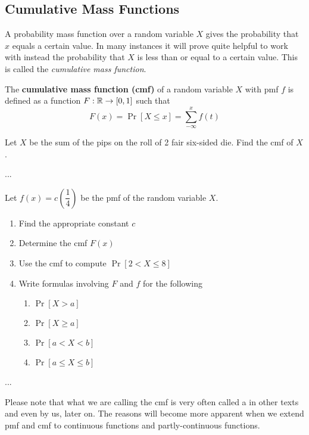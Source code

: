 \documentclass[../main.tex]{subfiles}
\begin{document}
\subsection{Cumulative Mass Functions}
A probability mass function over a random variable $X$ gives the probability 
that $x$ equals a certain value. In many instances it will prove quite helpful 
to work with instead the probability that $X$ is less than or equal to a 
certain value. This is called the \textit{cumulative mass function}.
\begin{definition}
The \textbf{cumulative mass function (cmf)} of a random variable $X$ with 
pmf $f$ is defined as a function $F: \mathbb{R}\rightarrow[0,1]$ such that
$$F(x) = \Pr[X \leq x] = \sum_{-\infty}^x f(t)$$
\end{definition}
\begin{example}Let $X$ be the sum of the pips on the roll of 2 fair six-sided
die. Find the cmf of $X$.
\end{example}
\begin{solution}
...
\end{solution}
\begin{example}
Let $f(x) = c\left(\dfrac{1}{4}\right)$ be the pmf of the random variable $X$. 
\begin{enumerate}
\item Find
the appropriate constant $c$
\item Determine the cmf $F(x)$
\item Use the cmf to compute $\Pr[2 < X \leq 8]$
\item Write formulas involving $F$ and $f$ for the following
    \begin{enumerate}
        \item $\Pr[X > a]$
        \item $\Pr[X \geq a]$
        \item $\Pr[a < X < b]$
        \item $\Pr[a \leq X \leq b]$
    \end{enumerate}
\end{enumerate}
\begin{solution}
...
\end{solution}
\begin{remark}
Please note that what we are calling the cmf is very often called a  in other texts and even by us, later on. The reasons will become more
apparent when we extend pmf and cmf to continuous functions and partly-continuous
functions.
\end{remark}
\end{example}
\end{document}
